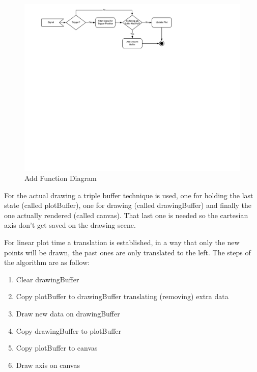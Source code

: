 \begin{figure}[htb]
  \caption{Add Function Diagram}
  \label{react-plotter-add-diagram}
  \centering
  \includegraphics[scale=0.9]{images/react-plotter-add-diagram}
\end{figure}
For the actual drawing a triple buffer technique is used, one for holding the last
state (called plotBuffer), one for drawing (called drawingBuffer) and finally the
one actually rendered (called canvas). That last one is needed so the cartesian axis
don't get saved on the drawing scene. 

For linear plot time a translation is established, in a way that only the new
points will be drawn, the past ones are only translated to the left. The steps
of the algorithm are as follow:
\begin{enumerate}
  \item Clear drawingBuffer
  \item Copy plotBuffer to drawingBuffer translating (removing) extra data
  \item Draw new data on drawingBuffer
  \item Copy drawingBuffer to plotBuffer
  \item Copy plotBuffer to canvas
  \item Draw axis on canvas
\end{enumerate}


